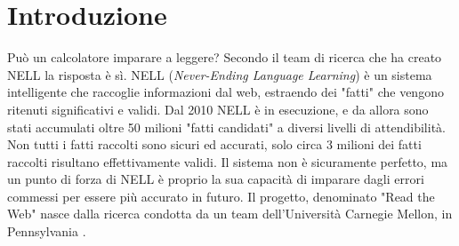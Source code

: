 \section*{Introduzione}
Può un calcolatore imparare a leggere? Secondo il team di ricerca che ha creato NELL la risposta è sì.\newline
NELL (\textit{Never-Ending Language Learning}) è un sistema intelligente che raccoglie informazioni dal web, estraendo dei "fatti" che vengono ritenuti significativi e validi.
Dal 2010 NELL è in esecuzione, e da allora sono stati accumulati oltre 50 milioni "fatti candidati" a diversi livelli di attendibilità.\newline
Non tutti i fatti raccolti sono sicuri ed accurati, solo circa 3 milioni dei fatti raccolti risultano effettivamente validi.
Il sistema non è sicuramente perfetto, ma un punto di forza di NELL è proprio la sua capacità di imparare dagli errori commessi per essere più accurato in futuro.\newline
Il progetto, denominato "Read the Web" nasce dalla ricerca condotta da un team dell'Università Carnegie Mellon, in Pennsylvania \cite{ReadtheWeb:online}.
\newpage